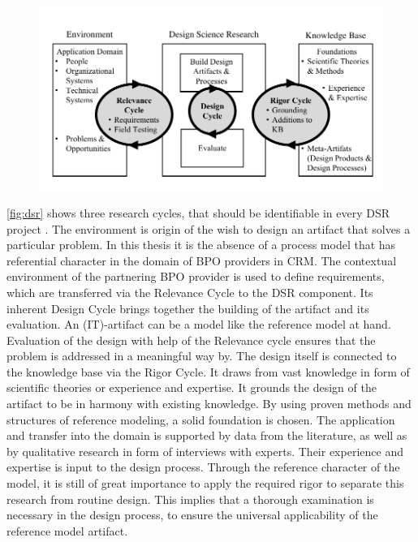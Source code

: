 			
\begin{figure}[caption={Design science research cycles Source: \cite{Hevner2010}}, label={fig:dsr}]
	{	\includegraphics[width=.8\textwidth]{figures/dsr.pdf}}
\end{figure}


\Fig \ref{fig:dsr} shows three research cycles, that should be identifiable in every \acrshort{DSR} project \cite{Hevner2010}. The environment is origin of the wish to design an artifact that solves a particular problem. In this thesis it is the absence of a process model that has referential character in the domain of \acrshort{BPO} providers in \acrshort{CRM}. The contextual environment of the partnering  \acrshort{BPO} provider is used to define requirements, which are transferred via the Relevance Cycle to the \acrshort{DSR} component. Its inherent Design Cycle brings together the building of the artifact and its evaluation. An (IT)-artifact can be a model \cite{Hevner2010} like the reference model at hand. Evaluation of the design with help of the Relevance cycle ensures that the problem is addressed in a meaningful way by. The design itself is connected to the knowledge base via the Rigor Cycle. It draws from vast knowledge in form of scientific theories or experience and expertise. It grounds the design of the artifact to be in harmony with existing knowledge. By using proven methods and structures of reference modeling, a solid foundation is chosen. The application and transfer into the domain is supported by data from the literature, as well as by qualitative research in form of interviews with experts. Their experience and expertise is input to the design process. Through the reference character of the model, it is still of great importance to apply the required rigor to separate this research from routine design. This implies that a thorough examination is necessary in the design process, to ensure the universal applicability of the reference model artifact. 



